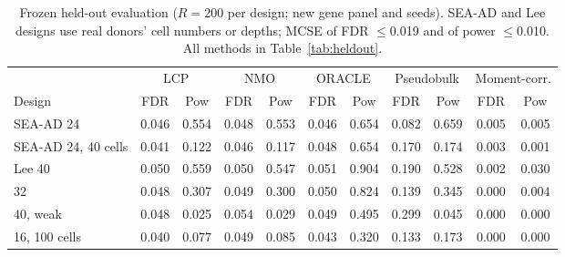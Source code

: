 \begin{table}[t]\centering
\caption{Frozen held-out evaluation ($R=200$ per design; new gene panel and seeds). SEA-AD and Lee designs use real donors' cell numbers or depths; MCSE of FDR $\le$0.019 and of power $\le$0.010. All methods in Table~\ref{tab:heldout}.}\label{tab:heldoutmain}
\begin{tabular}{lcccccccccc}
\toprule
& \multicolumn{2}{c}{LCP} & \multicolumn{2}{c}{NMO} & \multicolumn{2}{c}{ORACLE} & \multicolumn{2}{c}{Pseudobulk} & \multicolumn{2}{c}{Moment-corr.} \\
Design & FDR & Pow & FDR & Pow & FDR & Pow & FDR & Pow & FDR & Pow \\
\midrule
SEA-AD 24 & 0.046 & 0.554 & 0.048 & 0.553 & 0.046 & 0.654 & 0.082 & 0.659 & 0.005 & 0.005 \\
SEA-AD 24, 40 cells & 0.041 & 0.122 & 0.046 & 0.117 & 0.048 & 0.654 & 0.170 & 0.174 & 0.003 & 0.001 \\
Lee 40 & 0.050 & 0.559 & 0.050 & 0.547 & 0.051 & 0.904 & 0.190 & 0.528 & 0.002 & 0.030 \\
32 & 0.048 & 0.307 & 0.049 & 0.300 & 0.050 & 0.824 & 0.139 & 0.345 & 0.000 & 0.004 \\
40, weak & 0.048 & 0.025 & 0.054 & 0.029 & 0.049 & 0.495 & 0.299 & 0.045 & 0.000 & 0.000 \\
16, 100 cells & 0.040 & 0.077 & 0.049 & 0.085 & 0.043 & 0.320 & 0.133 & 0.173 & 0.000 & 0.000 \\
\bottomrule
\end{tabular}
\end{table}
